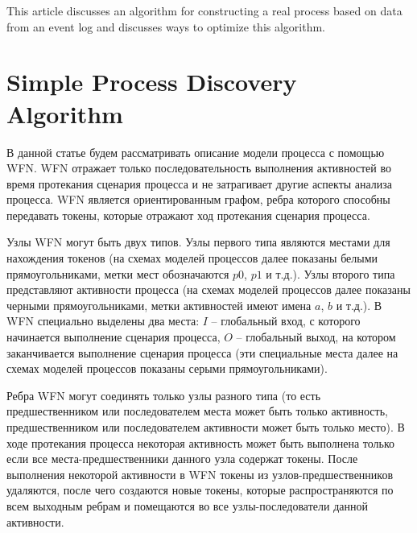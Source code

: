 \documentclass[
11pt,%
tightenlines,%
twoside,%
onecolumn,%
nofloats,%
nobibnotes,%
nofootinbib,%
superscriptaddress,%
noshowpacs,%
centertags]%
{revtex4}
\begin{document}
This article discusses an algorithm for constructing a real process based on data from an event log and discusses ways to optimize this algorithm.

\section{Simple Process Discovery Algorithm}

В данной статье будем рассматривать описание модели процесса с помощью WFN.
WFN отражает только последовательность выполнения активностей во время протекания сценария процесса и не затрагивает другие аспекты анализа процесса.
WFN является ориентированным графом, ребра которого способны передавать токены, которые отражают ход протекания сценария процесса.

Узлы WFN могут быть двух типов.
Узлы первого типа являются местами для нахождения токенов (на схемах моделей процессов далее показаны белыми прямоугольниками, метки мест обозначаются $p0$, $p1$ и т.д.).
Узлы второго типа представляют активности процесса (на схемах моделей процессов далее показаны черными прямоугольниками, метки активностей имеют имена $a$, $b$ и т.д.).
В WFN специально выделены два места: $I$ -- глобальный вход, с которого начинается выполнение сценария процесса, $O$ -- глобальный выход, на котором заканчивается выполнение сценария  процесса (эти специальные места далее на схемах моделей процессов показаны серыми прямоугольниками).

Ребра WFN могут соединять только узлы разного типа (то есть предшественником или последователем места может быть только активность, предшественником или последователем активности может быть только место).
В ходе протекания процесса некоторая активность может быть выполнена только если все места-предшественники данного узла содержат токены.
После выполнения некоторой активности в WFN токены из узлов-предшественников удаляются, после чего создаются новые токены, которые распространяются по всем выходным ребрам и помещаются во все узлы-последователи данной активности.
\end{document}
